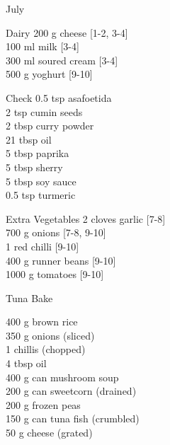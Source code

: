 \begin{menu}{July}
\begin{shoppinglist}{Dairy}
      200 g cheese {\scriptsize[1-2, 3-4]}\\
      100 ml milk {\scriptsize[3-4]}\\
      300 ml soured cream {\scriptsize[3-4]}\\
      500 g yoghurt {\scriptsize[9-10]}\\
      \end{shoppinglist}%
      \par\vfil %
      \vfil\clearpage %
      \begin{shoppinglist}{Check}
      0.5 tsp asafoetida \\
      2 tsp cumin seeds \\
      2 tbsp curry powder \\
      21 tbsp oil \\
      5 tbsp paprika \\
      5 tbsp sherry \\
      5 tbsp soy sauce \\
      0.5 tsp turmeric \\
      \end{shoppinglist}%
      \begin{shoppinglist}{Extra Vegetables}
      2 cloves garlic {\scriptsize[7-8]}\\
      700 g onions {\scriptsize[7-8, 9-10]}\\
      1  red chilli {\scriptsize[9-10]}\\
      400 g runner beans {\scriptsize[9-10]}\\
      1000 g tomatoes {\scriptsize[9-10]}\\
      \end{shoppinglist}%
      \par\vfil %
    \vfil\clearpage
  
    \begin{recipe}{2}{Tuna Bake}%
		\begin{ingredients}
		400 g brown rice  \\
	350 g onions (sliced) \\
	1  chillis (chopped) \\
	4 tbsp oil  \\
	400 g can mushroom soup  \\
	200 g can sweetcorn (drained) \\
	200 g frozen peas  \\
	150 g can tuna fish (crumbled) \\
	50 g cheese (grated) \\
	

\end{ingredients}
\end{recipe}
\end{menu}
